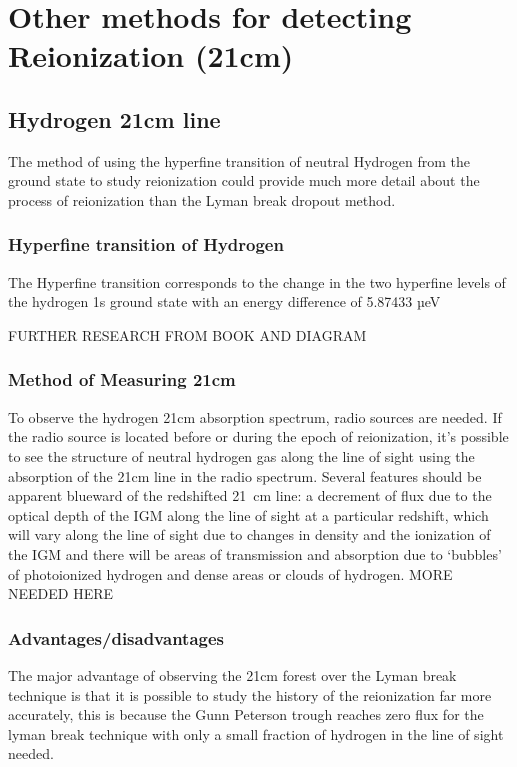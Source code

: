 
\section{Other methods for detecting Reionization (21cm)} %
\label{sec:other_methods_for_detecting_reionization}

    \subsection{Hydrogen 21cm line} %
    \label{sub:Hydrogen_21cm}
        The method of using the hyperfine transition of neutral Hydrogen from the ground state to study reionization could provide much more detail about the process of reionization than the Lyman break dropout method.

         \subsubsection{Hyperfine transition of Hydrogen} %
         \label{subsub:Hyperfine_Hydrogen}
            The Hyperfine transition corresponds to the change in the two hyperfine levels of the hydrogen 1s ground state with an energy difference of 5.87433 µeV

            FURTHER RESEARCH FROM BOOK AND DIAGRAM
	
        \subsubsection{Method of Measuring 21cm} %
    	\label{subsub:Measuring_21cm} 
            To observe the hydrogen 21cm absorption spectrum, radio sources are needed. If the radio source is located before or during the epoch of reionization, it’s possible to see the structure of neutral hydrogen gas along the line of sight using the absorption of the 21cm line in the radio spectrum. Several features should be apparent blueward of the redshifted \SI{21}{\centi\metre} line: a decrement of flux due to the optical depth of the IGM along the line of sight at a particular redshift, which will vary along the line of sight due to changes in density and the ionization of the IGM and there will be areas of transmission and absorption due to `bubbles' of photoionized hydrogen and dense areas or clouds of hydrogen.  MORE NEEDED HERE

        \subsubsection{Advantages/disadvantages} %
    	\label{subsub:Advantages_disadvantages_21cm}
            The major advantage of observing the 21cm forest over the Lyman break technique is that it is possible to study the history of the reionization far more accurately, this is because the Gunn Peterson trough reaches zero flux for the lyman break technique with only a small fraction of hydrogen in the line of sight needed. 

